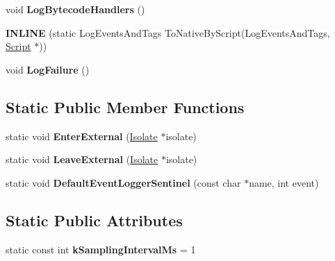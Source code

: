 \begin{DoxyCompactItemize}
\item 
void {\bfseries Log\+Bytecode\+Handlers} ()\hypertarget{classv8_1_1internal_1_1_logger_ad93d39ed09fc325c2cb491c12d0b6d28}{}\label{classv8_1_1internal_1_1_logger_ad93d39ed09fc325c2cb491c12d0b6d28}

\item 
{\bfseries I\+N\+L\+I\+NE} (static Log\+Events\+And\+Tags To\+Native\+By\+Script(Log\+Events\+And\+Tags, \hyperlink{classv8_1_1internal_1_1_script}{Script} $\ast$))\hypertarget{classv8_1_1internal_1_1_logger_a9bc9413ee8b19b6557f476b0e8ee8ea5}{}\label{classv8_1_1internal_1_1_logger_a9bc9413ee8b19b6557f476b0e8ee8ea5}

\item 
void {\bfseries Log\+Failure} ()\hypertarget{classv8_1_1internal_1_1_logger_ab5fc1e0f322695f69c7a6bcee79ceaa5}{}\label{classv8_1_1internal_1_1_logger_ab5fc1e0f322695f69c7a6bcee79ceaa5}

\end{DoxyCompactItemize}
\subsection*{Static Public Member Functions}
\begin{DoxyCompactItemize}
\item 
static void {\bfseries Enter\+External} (\hyperlink{classv8_1_1internal_1_1_isolate}{Isolate} $\ast$isolate)\hypertarget{classv8_1_1internal_1_1_logger_a89b6f2b7d49bb9d19dc26909aee24e65}{}\label{classv8_1_1internal_1_1_logger_a89b6f2b7d49bb9d19dc26909aee24e65}

\item 
static void {\bfseries Leave\+External} (\hyperlink{classv8_1_1internal_1_1_isolate}{Isolate} $\ast$isolate)\hypertarget{classv8_1_1internal_1_1_logger_a66eff83e012fb21ad8f2c9b41fcb6aaf}{}\label{classv8_1_1internal_1_1_logger_a66eff83e012fb21ad8f2c9b41fcb6aaf}

\item 
static void {\bfseries Default\+Event\+Logger\+Sentinel} (const char $\ast$name, int event)\hypertarget{classv8_1_1internal_1_1_logger_a0b3b1025f5f3662c0731bee4f99688be}{}\label{classv8_1_1internal_1_1_logger_a0b3b1025f5f3662c0731bee4f99688be}

\end{DoxyCompactItemize}
\subsection*{Static Public Attributes}
\begin{DoxyCompactItemize}
\item 
static const int {\bfseries k\+Sampling\+Interval\+Ms} = 1\hypertarget{classv8_1_1internal_1_1_logger_ae03be0fed70cdda7c26ff02b8a1586b0}{}\label{classv8_1_1internal_1_1_logger_ae03be0fed70cdda7c26ff02b8a1586b0}

\end{DoxyCompactItemize}
